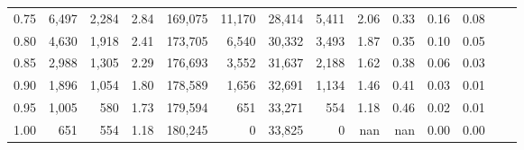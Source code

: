 \begin{tabular}{rrrrrrrrrrrrrr}
0.75 &   6,497 &  2,284 &    2.84 &  169,075 &   11,170 &  28,414 &   5,411 &  2.06 &  0.33 &  0.16 &      0.08 \\
0.80 &   4,630 &  1,918 &    2.41 &  173,705 &    6,540 &  30,332 &   3,493 &  1.87 &  0.35 &  0.10 &      0.05 \\
0.85 &   2,988 &  1,305 &    2.29 &  176,693 &    3,552 &  31,637 &   2,188 &  1.62 &  0.38 &  0.06 &      0.03 \\
0.90 &   1,896 &  1,054 &    1.80 &  178,589 &    1,656 &  32,691 &   1,134 &  1.46 &  0.41 &  0.03 &      0.01 \\
0.95 &   1,005 &    580 &    1.73 &  179,594 &      651 &  33,271 &     554 &  1.18 &  0.46 &  0.02 &      0.01 \\
1.00 &     651 &    554 &    1.18 &  180,245 &        0 &  33,825 &       0 &   nan &   nan &  0.00 &      0.00 \\
\bottomrule
\end{tabular}
